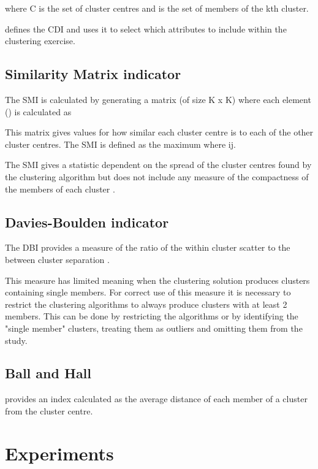 \documentclass[conference]{IEEEtran}
\begin{document}
where C is the set of cluster centres and  is the set of members of the kth cluster.

\cite{chicco2003customer} defines the CDI and uses it to select which attributes to include within the clustering exercise. 

\subsection{Similarity Matrix indicator}

The SMI is calculated by generating a matrix (of size K x K) where each element () is calculated as

This matrix gives values for how similar each cluster centre is to each of the other cluster centres. 
The SMI is defined as the maximum  where ij.

The SMI gives a statistic dependent on the spread of the cluster centres found by the clustering algorithm but does not include any measure of the compactness of the members of each cluster \cite{chicco2003application}.

\subsection{Davies-Boulden indicator}

The DBI provides a measure of the ratio of the within cluster scatter to the between cluster separation \cite{davies1979cluster}. 

This measure has limited meaning when the clustering solution produces clusters containing single members. For correct use of this measure it is necessary to restrict the clustering algorithms to always produce clusters with at least 2 members. This can be done by restricting the algorithms or by identifying the "single member" clusters, treating them as outliers and omitting them from the study.



\subsection{Ball and Hall} 
\cite{ball1965isodata} provides an index calculated as the average distance of each member of a cluster from the cluster centre.



\section{Experiments}
\end{document}
